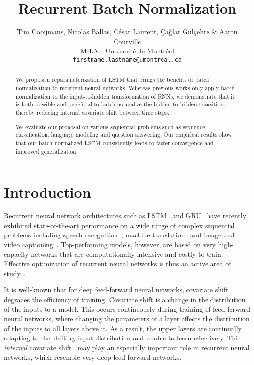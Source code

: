 \documentclass{article} \pdfoutput=1 \usepackage[utf8]{inputenc}
\title{Recurrent Batch Normalization}
\author{
Tim Cooijmans, Nicolas Ballas, C\'esar Laurent, Çağlar Gülçehre \& Aaron Courville \\
MILA - Universit\'e de Montr\'eal \\
\texttt{firstname.lastname@umontreal.ca} \\
}
\begin{document}
\maketitle

\begin{abstract}
We propose a reparameterization of LSTM that brings the benefits of batch normalization to recurrent neural networks.
Whereas previous works only apply batch normalization to the input-to-hidden transformation of RNNs,
we demonstrate that it is both possible and beneficial to batch-normalize the hidden-to-hidden transition,
thereby reducing internal covariate shift between time steps.

We evaluate our proposal on various sequential problems such as sequence classification, language modeling and question answering.
Our empirical results show that our batch-normalized LSTM consistently leads to faster convergence and improved generalization.
\end{abstract}

\section{Introduction}

Recurrent neural network architectures such as LSTM~\citep{lstm} and GRU~\citep{cho2014learning} have recently exhibited
state-of-the-art performance on a wide range of complex sequential problems including speech recognition~\cite{baidu},
machine translation~\citep{bahdanau2014neural} and image and video captioning~\citep{xu2015show,yao2015describing}.
Top-performing models, however, are based on very high-capacity networks that are computationally intensive and costly to train.
Effective optimization of recurrent neural networks is thus an active area of study~\citep{pascanudifficulty,hessianfree,ollivier}.

It is well-known that for deep feed-forward neural networks, covariate
shift~\citep{shimodaira2000improving,batchnorm} degrades the efficiency of training.  Covariate
shift is a change in the distribution of the inputs to a model.  This occurs continuously during
training of feed-forward neural networks, where changing the parameters of a layer affects the
distribution of the inputs to all layers above it.  As a result, the upper layers are continually
adapting to the shifting input distribution and unable to learn effectively.  This \emph{internal}
covariate shift~\citep{batchnorm} may play an especially important role in recurrent neural
networks, which resemble very deep feed-forward networks.
\end{document}
